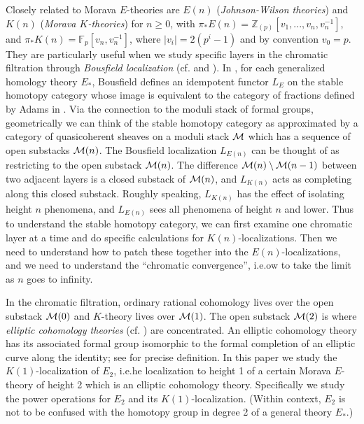 \documentclass{gtpart}
\theoremstyle{definition}
\theoremstyle{remark}
\newcommand{\mb}[1]{\mathbb{#1}}
\begin{document}
Closely related to Morava $E$-theories are $E(n)$ ({\em Johnson-Wilson 
theories}) and $K(n)$ ({\em Morava $K$-theories}) for $n \geq 0$, with 
$\pi_*E(n) = {\mb Z}_{(p)}[v_1,...,v_n,v_n^{-1}]$, and 
$\pi_*K(n) = {\mb F}_p[v_n,v_n^{-1}]$, where $|v_i| = 2(p^i-1)$ and by 
convention $v_0 = p$.  They are particularly useful when we study specific 
layers in the chromatic filtration through {\em Bousfield localization} (cf. 
\cite[chapter 7]{orange} and \cite[lectures 20--23]{252x}).  In 
\cite{bousfield}, for each generalized homology theory $E_*$, Bousfield 
defines an idempotent functor $L_E$ on the stable homotopy category whose 
image is equivalent to the category of fractions defined by Adams in 
\cite[section III.14]{sh}.  Via the connection to the moduli stack of formal 
groups, geometrically we can think of the stable homotopy category as 
approximated by a category of quasicoherent sheaves on a moduli stack $\cal M$ 
which has a sequence of open substacks ${\cal M}(n)$.  The Bousfield 
localization $L_{E(n)}$ can be thought of as restricting to the open substack 
${\cal M}(n)$.  The difference ${\cal M}(n) \setminus {\cal M}(n-1)$ between 
two adjacent layers is a closed substack of ${\cal M}(n)$, and $L_{K(n)}$ acts 
as completing along this closed substack.  Roughly speaking, $L_{K(n)}$ has 
the effect of isolating height $n$ phenomena, and $L_{E(n)}$ sees all 
phenomena of height $n$ and lower.  Thus to understand the stable homotopy 
category, we can first examine one chromatic layer at a time and do specific 
calculations for $K(n)$-localizations.  Then we need to understand how to 
patch these together into the $E(n)$-localizations, and we need to understand 
the ``chromatic convergence'', i.e.ow to take the limit as $n$ 
goes to infinity.  

In the chromatic filtration, ordinary rational cohomology lives over the open 
substack ${\cal M}(0)$ and $K$-theory lives over ${\cal M}(1)$.  The open 
substack ${\cal M}(2)$ is where {\em elliptic cohomology theories} (cf. 
\cite{survey}) are concentrated.  An elliptic cohomology theory has its 
associated formal group isomorphic to the formal completion of an elliptic 
curve along the identity; see \cite[definition 1.2]{survey} for precise 
definition.  In this paper we study the $K(1)$-localization of $E_2$, 
i.e.he localization to height 1 of a certain Morava $E$-theory of 
height 2 which is an elliptic cohomology theory.  Specifically we study the 
power operations for $E_2$ and its $K(1)$-localization.  (Within context, 
$E_2$ is not to be confused with the homotopy group in degree 2 of a general 
theory $E_*$.)  
\end{document}
